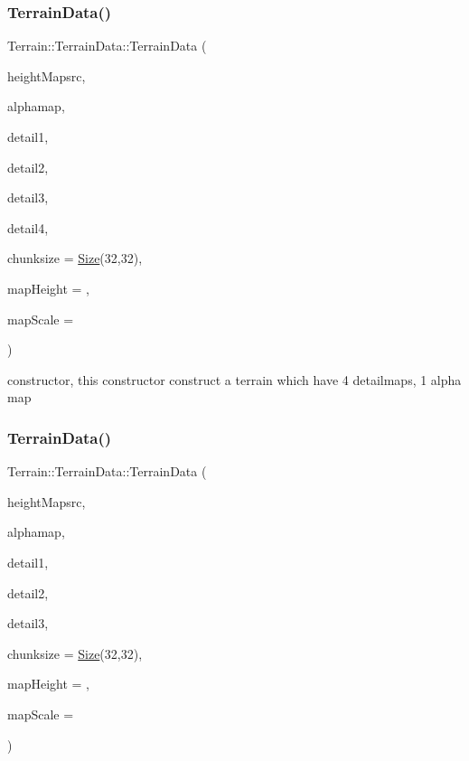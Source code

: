 \subsubsection{\texorpdfstring{Terrain\+Data()}{TerrainData()}\hspace{0.1cm}{\footnotesize\ttfamily [3/8]}}
{\footnotesize\ttfamily Terrain\+::\+Terrain\+Data\+::\+Terrain\+Data (\begin{DoxyParamCaption}\item[{const std\+::string \&}]{height\+Mapsrc,  }\item[{const std\+::string \&}]{alphamap,  }\item[{const \hyperlink{structTerrain_1_1DetailMap}{Detail\+Map} \&}]{detail1,  }\item[{const \hyperlink{structTerrain_1_1DetailMap}{Detail\+Map} \&}]{detail2,  }\item[{const \hyperlink{structTerrain_1_1DetailMap}{Detail\+Map} \&}]{detail3,  }\item[{const \hyperlink{structTerrain_1_1DetailMap}{Detail\+Map} \&}]{detail4,  }\item[{const \hyperlink{classSize}{Size} \&}]{chunksize = {\ttfamily \hyperlink{classSize}{Size}(32,32)},  }\item[{float}]{map\+Height = {},  }\item[{float}]{map\+Scale = {} }\end{DoxyParamCaption})}

constructor, this constructor construct a terrain which have 4 detailmaps, 1 alpha map \mbox{\label{structTerrain_1_1TerrainData_ae57aa479b584a59c7dcd44266b91a024}} 
\subsubsection{\texorpdfstring{Terrain\+Data()}{TerrainData()}\hspace{0.1cm}{\footnotesize\ttfamily [4/8]}}
{\footnotesize\ttfamily Terrain\+::\+Terrain\+Data\+::\+Terrain\+Data (\begin{DoxyParamCaption}\item[{const std\+::string \&}]{height\+Mapsrc,  }\item[{const std\+::string \&}]{alphamap,  }\item[{const \hyperlink{structTerrain_1_1DetailMap}{Detail\+Map} \&}]{detail1,  }\item[{const \hyperlink{structTerrain_1_1DetailMap}{Detail\+Map} \&}]{detail2,  }\item[{const \hyperlink{structTerrain_1_1DetailMap}{Detail\+Map} \&}]{detail3,  }\item[{const \hyperlink{classSize}{Size} \&}]{chunksize = {\ttfamily \hyperlink{classSize}{Size}(32,32)},  }\item[{float}]{map\+Height = {},  }\item[{float}]{map\+Scale = {} }\end{DoxyParamCaption})}

